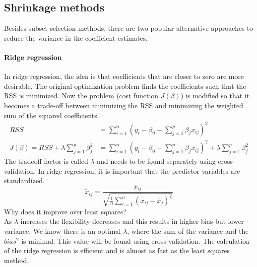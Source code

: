 \documentclass[../document.tex]{subfiles}
\begin{document}
	\sectionbreak
	\subsection{Shrinkage methods}
	Besides subset selection methods, there are two popular alternative approaches to reduce the variance in the coefficient estimates.

	\paragraph{Ridge regression}
	In ridge regression, the idea is that coefficients that are closer to zero are more desirable. The original optimization problem finds the coefficients such that the RSS is minimized. Now the problem (cost function $J(\beta)$) is modified so that it becomes a trade-off between minimizing the RSS and minimizing the weighted sum of the squared coefficients.
	\begin{equation}
	\begin{split}
		RSS &= \sum_{i=1}^{n}(y_{i}-\beta_{0}-\sum_{j=1}^{p}\beta_{j}x_{ij})^2\\
		J(\beta) = RSS+\lambda\sum_{j=1}^{p}\beta_{j}^2 &= \sum_{i=1}^{n}(y_{i}-\beta_{0}-\sum_{j=1}^{p}\beta_{j}x_{ij})^2+\lambda\sum_{j=1}^{p}\beta_{j}^2
	\end{split}
	\end{equation}
	The tradeoff factor is called \(\lambda\) and needs to be found separately using cross-validation. In ridge regression, it is important that the predictor variables are standardized.
	\begin{equation}
		\tilde{x}_{ij}=\frac{x_{ij}}{\sqrt{\frac{1}{n}\sum_{i=1}^{n}(x_{ij}-\overline{x}_{j})^2}}
	\end{equation}
	Why does it improve over least squares?\\
	As \(\lambda\) increases the flexibility decreases and this results in higher bias but lower variance. We know there is an optimal \(\lambda\), where the sum of the variance and the \(bias^2\) is minimal. This value will be found using cross-validation. The calculation of the ridge regression is efficient and is almost as fast as the least squares method.
\end{document}
